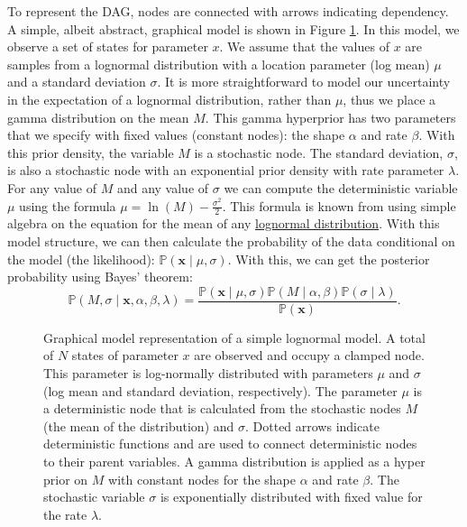 To represent the DAG, nodes are connected with arrows indicating dependency. 
A simple, albeit abstract, graphical model is shown in Figure \ref{simpleGM}. 
In this model, we observe a set of states for parameter $x$. 
We assume that the values of $x$ are samples from a lognormal distribution with a location parameter (log mean) $\mu$ and a standard deviation $\sigma$. 
It is more straightforward to model our uncertainty in the expectation of a lognormal distribution, rather than $\mu$, thus we place a gamma distribution on the mean $M$. 
This gamma hyperprior has two parameters that we specify with fixed values (constant nodes): the shape $\alpha$ and rate $\beta$. 
With this prior density, the variable $M$ is a stochastic node.
The standard deviation, $\sigma$, is also a stochastic node with an exponential prior density with rate parameter $\lambda$.
For any value of $M$ and any value of $\sigma$ we can compute the deterministic variable $\mu$ using the formula $\mu = \ln(M) - \frac{\sigma^2}{2}$. 
This formula is known from using simple algebra on the equation for the mean of any \href{http://en.wikipedia.org/wiki/Log-normal_distribution}{lognormal distribution}.
With this model structure, we can then calculate the probability of the data conditional on the model (the likelihood): 
$\mathbb{P}(\boldsymbol{x} \mid \mu, \sigma)$. With this, we can get the posterior probability using Bayes' theorem:
$$\mathbb{P}(M,\sigma \mid \boldsymbol{x}, \alpha, \beta, \lambda) = \frac{\mathbb{P}(\boldsymbol{x} \mid \mu, \sigma) \mathbb{P}(M \mid \alpha,\beta) \mathbb{P}(\sigma \mid \lambda)}{\mathbb{P}(\boldsymbol{x})}.$$
\begin{figure}[h!]
\centering
{}
\caption{\small Graphical model representation of a simple lognormal model. A total of $N$ states of parameter $x$ are observed and occupy a clamped node. 
This parameter is log-normally distributed with parameters $\mu$ and $\sigma$ (log mean and standard deviation, respectively). 
The parameter $\mu$ is a deterministic node that is calculated from the stochastic nodes $M$ (the mean of the distribution) and $\sigma$. 
Dotted arrows indicate deterministic functions and are used to connect deterministic nodes to their parent variables. 
A gamma distribution is applied as a hyper prior on $M$ with constant nodes for the shape $\alpha$ and rate $\beta$. 
The stochastic variable $\sigma$ is exponentially distributed with fixed value for the rate $\lambda$.
}
\label{simpleGM}
\end{figure}



